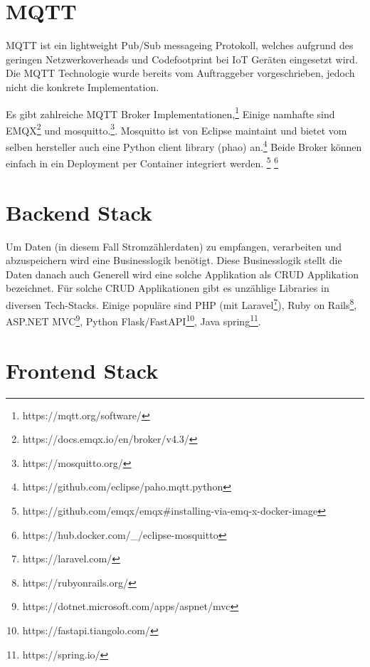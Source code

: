 
\section{MQTT} %
\label{state:mqtt}

\ac{MQTT} ist ein lightweight Pub/Sub messageing Protokoll, welches aufgrund des
geringen Netzwerkoverheads und Codefootprint bei \ac{IoT} Geräten eingesetzt wird.\cite{mqtt}
Die \ac{MQTT} Technologie wurde bereits vom Auftraggeber vorgeschrieben, jedoch
nicht die konkrete Implementation.

Es gibt zahlreiche \ac{MQTT} Broker Implementationen,\footnote{https://mqtt.org/software/}
Einige namhafte sind EMQX\footnote{https://docs.emqx.io/en/broker/v4.3/} und mosquitto.\footnote{https://mosquitto.org/}.
Mosquitto ist von Eclipse maintaint und bietet vom selben hersteller auch eine
Python client library (phao) an.\footnote{https://github.com/eclipse/paho.mqtt.python}
Beide Broker können einfach in ein Deployment per Container integriert werden.
\footnote{https://github.com/emqx/emqx\#installing-via-emq-x-docker-image} \footnote{https://hub.docker.com/\_/eclipse-mosquitto}

\section{Backend Stack}
\label{state:backend}

Um Daten (in diesem Fall Stromzählerdaten) zu empfangen, verarbeiten und abzuspeichern
wird eine Businesslogik benötigt. Diese Businesslogik stellt die Daten
danach auch  Generell wird eine solche Applikation als \ac{CRUD} Applikation
bezeichnet. \parencite{sulemani_2021} \parencite{johnston_2021}
Für solche \ac{CRUD} Applikationen gibt es unzählige Libraries in diversen Tech-Stacks.
Einige populäre sind PHP (mit Laravel\footnote{https://laravel.com/}),
Ruby on Rails\footnote{https://rubyonrails.org/}, ASP.NET MVC\footnote{https://dotnet.microsoft.com/apps/aspnet/mvc},
Python Flask/FastAPI\footnote{https://fastapi.tiangolo.com/}, Java spring\footnote{https://spring.io/}.


\section{Frontend Stack}
\label{state:frontend}

